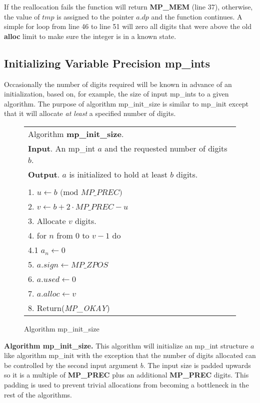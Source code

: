 \documentclass[b5paper]{book}
\begin{document}
If the reallocation fails the function will return \textbf{MP\_MEM} (line 37), otherwise, the value of $tmp$ is assigned
to the pointer $a.dp$ and the function continues.  A simple for loop from line 46 to line 51 will zero all digits 
that were above the old \textbf{alloc} limit to make sure the integer is in a known state.

\subsection{Initializing Variable Precision mp\_ints}
Occasionally the number of digits required will be known in advance of an initialization, based on, for example, the size 
of input mp\_ints to a given algorithm.  The purpose of algorithm mp\_init\_size is similar to mp\_init except that it 
will allocate \textit{at least} a specified number of digits.  

\begin{figure}[here]
\begin{small}
\begin{center}
\begin{tabular}{l}
\hline Algorithm \textbf{mp\_init\_size}. \\
\textbf{Input}.   An mp\_int $a$ and the requested number of digits $b$. \\
\textbf{Output}.  $a$ is initialized to hold at least $b$ digits. \\
\hline \\
1.  $u \leftarrow b \mbox{ (mod }MP\_PREC\mbox{)}$ \\
2.  $v \leftarrow b + 2 \cdot MP\_PREC - u$ \\
3.  Allocate $v$ digits. \\
4.  for $n$ from $0$ to $v - 1$ do \\
\hspace{3mm}4.1  $a_n \leftarrow 0$ \\
5.  $a.sign \leftarrow MP\_ZPOS$\\
6.  $a.used \leftarrow 0$\\
7.  $a.alloc \leftarrow v$\\
8.  Return(\textit{MP\_OKAY})\\
\hline
\end{tabular}
\end{center}
\end{small}
\caption{Algorithm mp\_init\_size}
\end{figure}

\textbf{Algorithm mp\_init\_size.}
This algorithm will initialize an mp\_int structure $a$ like algorithm mp\_init with the exception that the number of 
digits allocated can be controlled by the second input argument $b$.  The input size is padded upwards so it is a 
multiple of \textbf{MP\_PREC} plus an additional \textbf{MP\_PREC} digits.  This padding is used to prevent trivial 
allocations from becoming a bottleneck in the rest of the algorithms.
\end{document}
